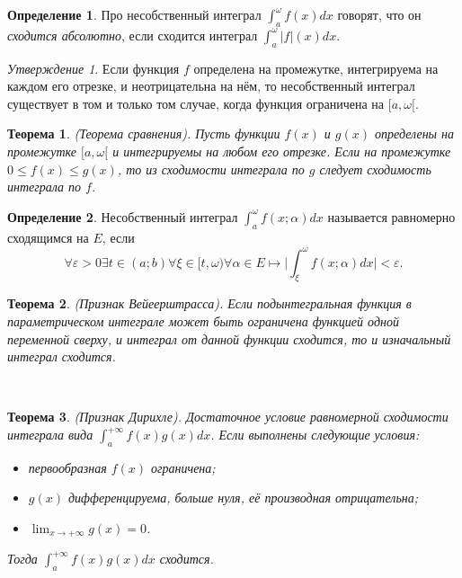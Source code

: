 \documentclass[a4paper,100pt]{article}
\theoremstyle{indented}
\newtheorem{theorem}{Теорема}
\theoremstyle{definition}
\newtheorem{defn}{Определение}
\theoremstyle{remark}
\newtheorem{stat}{Утверждение}
\begin{document}
\begin{defn}
    Про несобственный интеграл $\int_a^\omega f(x)dx$ говорят, что он \textit{сходится абсолютно}, если сходится интеграл $\int_a^\omega |f|(x)dx$. 
\end{defn}

\begin{stat}
    Если функция $f$ определена на промежутке, интегрируема на каждом его отрезке, и неотрицательна на нём, то несобственный интеграл существует в том и только том случае, когда функция ограничена на $[a, \omega[$. 
\end{stat}

\begin{theorem}
    (Теорема сравнения). Пусть функции $f(x)$ и $g(x)$ определены на промежутке $[a, \omega[$ и интегрируемы на любом его отрезке. Если на промежутке $0\leq f(x) \leq g(x)$, то из сходимости интеграла по $g$ следует сходимость интеграла по $f$. 
\end{theorem}

\begin{defn}
    Несобственный интеграл $\int_a^\omega f(x;\alpha)dx$ называется равномерно сходящимся на $E$, если 
    \[
        \forall \varepsilon>0 \exists t\in(a;b) \forall \xi \in [t, \omega) \forall \alpha \in E \mapsto \bigg| \int_\xi^\omega f(x;\alpha)dx \bigg|<\varepsilon.
    \]
\end{defn}

\begin{theorem}
    (Признак Вейеерштрасса). Если подынтегральная функция в параметрическом интеграле может быть ограничена функцией одной переменной сверху, и интеграл от данной функции сходится, то и изначальный интеграл сходится.
\end{theorem} \

\begin{theorem}
    (Признак Дирихле). Достаточное условие равномерной сходимости интеграла вида $\int_a^{+\infty}f(x)g(x)dx$. Если выполнены следующие условия: 

    \begin{itemize}
        \item первообразная $f(x)$ ограничена; 
        \item $g(x)$ дифференцируема, больше нуля, её производная отрицательна; 
        \item $\lim_{x\rightarrow +\infty} g(x)=0$. 
    \end{itemize}

    Тогда $\int_a^{+\infty}f(x)g(x)dx$ сходится.
\end{theorem}
\end{document}
